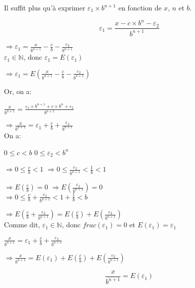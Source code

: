 \documentclass[a4paper, 12pt]{article}
\begin{document}
Il suffit plus qu'à exprimer $\varepsilon_{1} \times b^{n+1}$ en fonction de $x$, $n$ et $b$.

\[
\varepsilon_{1} = \frac{x - c \times b^{n} - \varepsilon_{2}}{b^{n+1}}
\]

$\Rightarrow \varepsilon_{1} =
\frac{x}{b^{n+1}} - \frac{c}{b} - \frac{\varepsilon_{2}}{b^{n+1}}$ \\

$\varepsilon_{1} \in \mathbb{N}$, donc $\varepsilon_{1} = E \left( \varepsilon_{1} \right)$

$\Rightarrow \varepsilon_{1} =
E \left( \frac{x}{b^{n+1}} - \frac{c}{b} - \frac{\varepsilon_{2}}{b^{n+1}} \right)$ \\

\newpage

Or, on a:

$\frac{x}{b^{n+1}} =
\frac{\varepsilon_{1} \times b^{n + 1} + c \times b^{n} + \varepsilon_{2}}{b^{n+1}}$

$\Rightarrow \frac{x}{b^{n+1}} =
\varepsilon_{1} + \frac{c}{b} + \frac{\varepsilon_{2}}{b^{n+1}}$ \\

On a:

$0 \leqslant c < b$ \hspace{5cm} $0 \leqslant \varepsilon_{2} < b^{n}$

$\Rightarrow 0 \leqslant \frac{c}{b} < 1$ \hspace{44mm}
$\Rightarrow 0 \leqslant \frac{\varepsilon_{2}}{b^{n+1}} < \frac{1}{b} < 1$

$\Rightarrow E \left( \frac{c}{b} \right) = 0$ \hspace{44mm}
$\Rightarrow E \left( \frac{\varepsilon_{2}}{b^{n+1}} \right) = 0$ \\

$\Rightarrow 0 \leqslant \frac{c}{b} + \frac{\varepsilon_{2}}{b^{n+1}} < 1 + \frac{1}{b} < b$

$\Rightarrow E \left( \frac{c}{b} + \frac{\varepsilon_{2}}{b^{n+1}} \right) =
E \left( \frac{c}{b} \right) + E \left( \frac{\varepsilon_{2}}{b^{n+1}} \right)$ \\

Comme dit, $\varepsilon_{1} \in \mathbb{N}$, donc $frac \left( \varepsilon_{1} \right) = 0$
 et $E \left( \varepsilon_{1} \right) = \varepsilon_{1}$

$
\frac{x}{b^{n+1}} =
\varepsilon_{1} + \frac{c}{b} + \frac{\varepsilon_{2}}{b^{n+1}}
$

$
\Rightarrow \frac{x}{b^{n+1}} =
E \left( \varepsilon_{1} \right) +
E \left( \frac{c}{b} \right) +
E \left( \frac{\varepsilon_{2}}{b^{n+1}} \right)
$

\[
\frac{x}{b^{n+1}} =
E \left( \varepsilon_{1} \right)
\]
\end{document}
